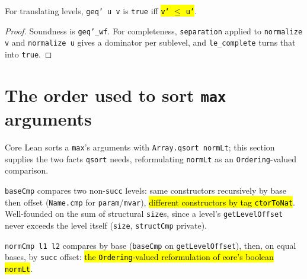 \begin{theorem}
\label{thm:lvl-geq-prime-complete}
\leanok
{}
 For translating levels, \texttt{geq' u v} is \texttt{true} iff \hl{\texttt{v'} $\le$
\texttt{u'}}.
\end{theorem}
\begin{proof}
\leanok
{} Soundness is \texttt{geq'\_wf}. For completeness, \texttt{separation} applied to
\texttt{normalize v} and \texttt{normalize u} gives a dominator per sublevel, and \texttt{le\_complete}
turns that into \texttt{true}.
\end{proof}

\section{The order used to sort \texttt{max} arguments}

Core Lean sorts a \texttt{max}'s arguments with \texttt{Array.qsort normLt}; this section supplies
the two facts \texttt{qsort} needs, reformulating \texttt{normLt} as an \texttt{Ordering}-valued
comparison.

\begin{definition}
\label{def:normlt-size-basecmp}
\leanok
{}

 \texttt{baseCmp} compares two non-\texttt{succ} levels: same constructors recursively
by base then offset (\texttt{Name.cmp} for \texttt{param}/\texttt{mvar}), \hl{different constructors
by tag \texttt{ctorToNat}}. Well-founded on the sum of structural \texttt{size}s, since a level's
\texttt{getLevelOffset} never exceeds the level itself (\texttt{size}, \texttt{structCmp} private).
\end{definition}

\begin{definition}
\label{def:normlt-normcmp}
\leanok
{}
 \texttt{normCmp l1 l2} compares by base (\texttt{baseCmp} on
\texttt{getLevelOffset}), then, on equal bases, by \texttt{succ} offset: \hl{the \texttt{Ordering}-valued
reformulation of core's boolean \texttt{normLt}}.
\end{definition}

